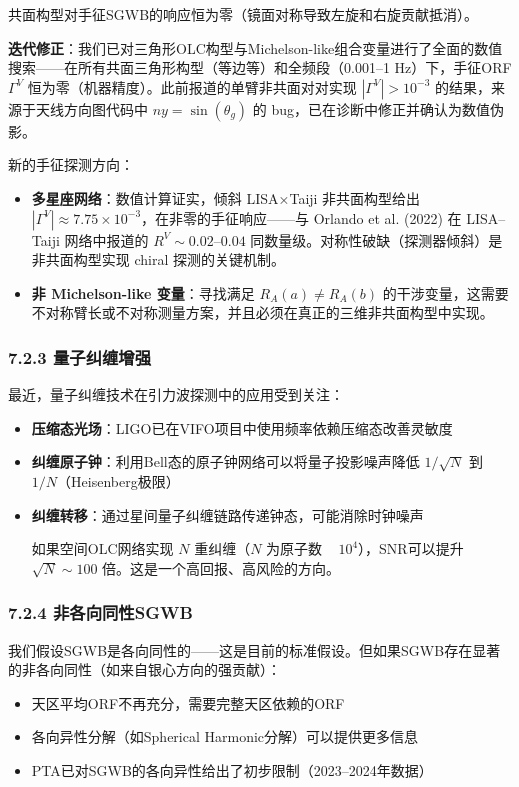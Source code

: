 \documentclass[12pt,a4paper]{article}
\begin{document}
共面构型对手征SGWB的响应恒为零（镜面对称导致左旋和右旋贡献抵消）。

\textbf{迭代修正}：我们已对三角形OLC构型与Michelson-like组合变量进行了全面的数值搜索——在所有共面三角形构型（等边等）和全频段（0.001–1 Hz）下，手征ORF $\Gamma^V$ 恒为零（机器精度）。此前报道的单臂非共面对对实现 $|\Gamma^V| > 10^{-3}$ 的结果，来源于天线方向图代码中 $ny = \sin(\theta_g)$ 的 bug，已在诊断中修正并确认为数值伪影。

新的手征探测方向：
\begin{itemize}
  \item \textbf{多星座网络}：数值计算证实，倾斜 LISA×Taiji 非共面构型给出 $|\Gamma^V| \approx 7.75\times 10^{-3}$，在非零的手征响应——与 Orlando et al. (2022) 在 LISA–Taiji 网络中报道的 $R^V \sim 0.02$–$0.04$ 同数量级。对称性破缺（探测器倾斜）是非共面构型实现 chiral 探测的关键机制。
  \item \textbf{非 Michelson-like 变量}：寻找满足 $R_A(a) \neq R_A(b)$ 的干涉变量，这需要不对称臂长或不对称测量方案，并且必须在真正的三维非共面构型中实现。

\end{itemize}
\subsubsection{7.2.3 量子纠缠增强}


最近，量子纠缠技术在引力波探测中的应用受到关注：
\begin{itemize}
  \item \textbf{压缩态光场}：LIGO已在VIFO项目中使用频率依赖压缩态改善灵敏度
  \item \textbf{纠缠原子钟}：利用Bell态的原子钟网络可以将量子投影噪声降低 $1/\sqrt{N}$ 到 $1/N$（Heisenberg极限）
  \item \textbf{纠缠转移}：通过星间量子纠缠链路传递钟态，可能消除时钟噪声

如果空间OLC网络实现 $N$ 重纠缠（$N$ 为原子数 ~ $10^4$），SNR可以提升 $\sqrt{N} \sim 100$ 倍。这是一个高回报、高风险的方向。

\end{itemize}
\subsubsection{7.2.4 非各向同性SGWB}


我们假设SGWB是各向同性的——这是目前的标准假设。但如果SGWB存在显著的非各向同性（如来自银心方向的强贡献）：

\begin{itemize}
  \item 天区平均ORF不再充分，需要完整天区依赖的ORF
  \item 各向异性分解（如Spherical Harmonic分解）可以提供更多信息
  \item PTA已对SGWB的各向异性给出了初步限制（2023–2024年数据）

\end{itemize}
\end{document}
